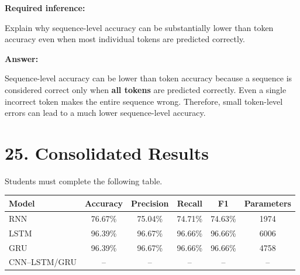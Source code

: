 \documentclass[10pt]{article}
\begin{document}
\textbf{Required inference:}

Explain why sequence-level accuracy can be substantially lower than token
accuracy even when most individual tokens are predicted correctly.

\textbf{Answer:}

Sequence-level accuracy can be lower than token accuracy because a sequence is considered correct only when \textbf{all tokens} are predicted correctly. Even a single incorrect token makes the entire sequence wrong. Therefore, small token-level errors can lead to a much lower sequence-level accuracy.





\section*{25. Consolidated Results}

Students must complete the following table.

\begin{center}

\begin{tabular}{|l|c|c|c|c|c|}
\hline
\textbf{Model} & \textbf{Accuracy} & \textbf{Precision} & \textbf{Recall} & \textbf{F1} & \textbf{Parameters} \\
\hline
RNN  & 76.67\% & 75.04\% & 74.71\% & 74.63\% & 1974 \\
\hline
LSTM & 96.39\% & 96.67\% & 96.66\% & 96.66\% & 6006 \\
\hline
GRU  & 96.39\% & 96.67\% & 96.66\% & 96.66\% & 4758 \\
\hline
CNN--LSTM/GRU & -- & -- & -- & -- & -- \\
\hline
\end{tabular}

\end{center}
\end{document}
